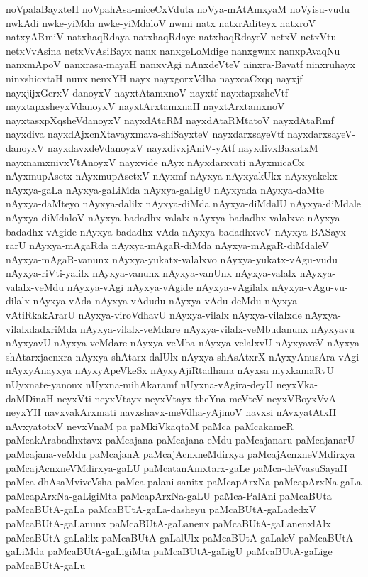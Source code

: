 {noVpalaBayxteH
noVpahAsa-miceCxVduta
noVya-mAtAmxyaM
noVyisu-vudu
nwkAdi
nwke-yiMda
nwke-yiMdaloV
nwmi
natx
natxrAditeyx
natxroV
natxyARmiV
natxhaqRdaya
natxhaqRdaye
natxhaqRdayeV
netxV
netxVtu
netxVvAsina
netxVvAsiBayx
nanx
nanxgeLoMdige
nanxgwnx
nanxpAvaqNu
nanxmApoV
nanxrasa-mayaH
nanxvAgi
nAnxdeVteV
ninxra-Bavatf
ninxruhayx
ninxshicxtaH
nunx
nenxYH
nayx
nayxgorxVdha
nayxcaCxqq
nayxjf
nayxjijxGerxV-danoyxV
nayxtAtamxnoV
nayxtf
nayxtapxsheVtf
nayxtapxsheyxVdanoyxV
nayxtArxtamxnaH
nayxtArxtamxnoV
nayxtasxpXqsheVdanoyxV
nayxdAtaRM
nayxdAtaRMtatoV
nayxdAtaRmf
nayxdiva
nayxdAjxcnXtavayxmava-shiSayxteV
nayxdarxsayeVtf
nayxdarxsayeV-danoyxV
nayxdavxdeVdanoyxV
nayxdivxjAniV-yAtf
nayxdivxBakatxM
nayxnamxnivxVtAnoyxV
nayxvide
nAyx
nAyxdarxvati
nAyxmicaCx
nAyxmupAsetx
nAyxmupAsetxV
nAyxmf
nAyxya
nAyxyakUkx
nAyxyakekx
nAyxya-gaLa
nAyxya-gaLiMda
nAyxya-gaLigU
nAyxyada
nAyxya-daMte
nAyxya-daMteyo
nAyxya-dalilx
nAyxya-diMda
nAyxya-diMdalU
nAyxya-diMdale
nAyxya-diMdaloV
nAyxya-badadhx-valalx
nAyxya-badadhx-valalxve
nAyxya-badadhx-vAgide
nAyxya-badadhx-vAda
nAyxya-badadhxveV
nAyxya-BASayx-rarU
nAyxya-mAgaRda
nAyxya-mAgaR-diMda
nAyxya-mAgaR-diMdaleV
nAyxya-mAgaR-vanunx
nAyxya-yukatx-valalxvo
nAyxya-yukatx-vAgu-vudu
nAyxya-riVti-yalilx
nAyxya-vanunx
nAyxya-vanUnx
nAyxya-valalx
nAyxya-valalx-veMdu
nAyxya-vAgi
nAyxya-vAgide
nAyxya-vAgilalx
nAyxya-vAgu-vu-dilalx
nAyxya-vAda
nAyxya-vAdudu
nAyxya-vAdu-deMdu
nAyxya-vAtiRkakArarU
nAyxya-viroVdhavU
nAyxya-vilalx
nAyxya-vilalxde
nAyxya-vilalxdadxriMda
nAyxya-vilalx-veMdare
nAyxya-vilalx-veMbudanunx
nAyxyavu
nAyxyavU
nAyxya-veMdare
nAyxya-veMba
nAyxya-velalxvU
nAyxyaveV
nAyxya-shAtarxjacnxra
nAyxya-shAtarx-dalUlx
nAyxya-shAsAtxrX
nAyxyAnusAra-vAgi
nAyxyAnayxya
nAyxyApeVkeSx
nAyxyAjiRtadhana
nAyxsa
niyxkamaRvU
nUyxnate-yanonx
nUyxna-mihAkaramf
nUyxna-vAgira-deyU
neyxVka-daMDinaH
neyxVti
neyxVtayx
neyxVtayx-theYna-meVteV
neyxVBoyxVvA
neyxYH
navxvakArxmati
navxshavx-meVdha-yAjinoV
navxsi
nAvxyatAtxH
nAvxyatotxV
nevxVnaM
pa
paMkiVkaqtaM
paMca
paMcakameR
paMcakArabadhxtavx
paMcajana
paMcajana-eMdu
paMcajanaru
paMcajanarU
paMcajana-veMdu
paMcajanA
paMcajAcnxneMdirxya
paMcajAcnxneVMdirxya
paMcajAcnxneVMdirxya-gaLU
paMcatanAmxtarx-gaLe
paMca-deVvasuSayaH
paMca-dhAsaMviveVsha
paMca-palani-sanitx
paMcapArxNa
paMcapArxNa-gaLa
paMcapArxNa-gaLigiMta
paMcapArxNa-gaLU
paMca-PalAni
paMcaBUta
paMcaBUtA-gaLa
paMcaBUtA-gaLa-dasheyu
paMcaBUtA-gaLadedxV
paMcaBUtA-gaLanunx
paMcaBUtA-gaLanenx
paMcaBUtA-gaLanenxlAlx
paMcaBUtA-gaLalilx
paMcaBUtA-gaLalUlx
paMcaBUtA-gaLaleV
paMcaBUtA-gaLiMda
paMcaBUtA-gaLigiMta
paMcaBUtA-gaLigU
paMcaBUtA-gaLige
paMcaBUtA-gaLu
}
